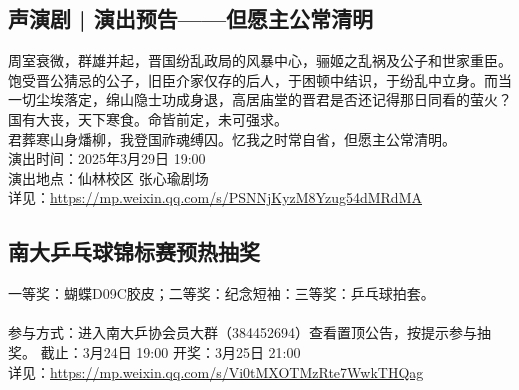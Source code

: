 \documentclass[letterpaper, 12pt]{article}
\begin{document}
\begin{multicols}{2}
\subsection{声演剧 | 演出预告——但愿主公常清明}
周室衰微，群雄并起，晋国纷乱政局的风暴中心，骊姬之乱祸及公子和世家重臣。饱受晋公猜忌的公子，旧臣介家仅存的后人，于困顿中结识，于纷乱中立身。而当一切尘埃落定，绵山隐士功成身退，高居庙堂的晋君是否还记得那日同看的萤火？国有大丧，天下寒食。命皆前定，未可强求。
\\君葬寒山身燔柳，我登国祚魂缚囚。忆我之时常自省，但愿主公常清明。  
\\演出时间：2025年3月29日 19:00
\\演出地点：仙林校区 张心瑜剧场
\\详见：\url{https://mp.weixin.qq.com/s/PSNNjKyzM8Yzug54dMRdMA}

\subsection{南大乒乓球锦标赛预热抽奖}
一等奖：蝴蝶D09C胶皮；二等奖：纪念短袖：三等奖：乒乓球拍套。
\\
\\参与方式：进入南大乒协会员大群（384452694）查看置顶公告，按提示参与抽奖。
截止：3月24日 19:00
开奖：3月25日 21:00
\\详见：\url{https://mp.weixin.qq.com/s/Vi0tMXOTMzRte7WwkTHQag}


\end{multicols}
\end{document}

